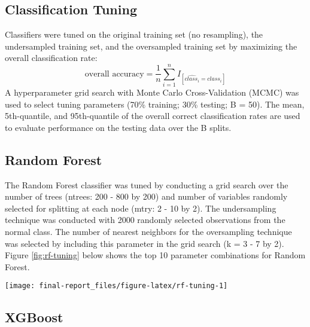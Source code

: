 \clearpage



\begin{appendix}
\clearpage
\appendix

\hypertarget{classification-tuning}{%
\section{\texorpdfstring{Classification Tuning
\label{app:tuning}}{Classification Tuning }}\label{classification-tuning}}

Classifiers were tuned on the original training set (no resampling), the
undersampled training set, and the oversampled training set by
maximizing the overall classification rate:
\[\text{overall accuracy} = \frac{1}{n}\sum_{i=1}^{n} I_{[\widehat{class_i}=class_i]}\]
A hyperparameter grid search with Monte Carlo Cross-Validation (MCMC)
was used to select tuning parameters (70\% training; 30\% testing; B =
50). The mean, 5th-quantile, and 95th-quantile of the overall correct
classification rates are used to evaluate performance on the testing
data over the B splits.

\hypertarget{random-forest}{%
\subsection{\texorpdfstring{Random Forest
\label{app:rf-tuning}}{Random Forest }}\label{random-forest}}

The Random Forest classifier was tuned by conducting a grid search over
the number of trees (ntrees: 200 - 800 by 200) and number of variables
randomly selected for splitting at each node (mtry: 2 - 10 by 2). The
undersampling technique was conducted with 2000 randomly selected
observations from the normal class. The number of nearest neighbors for
the oversampling technique was selected by including this parameter in
the grid search (k = 3 - 7 by 2). Figure \ref{fig:rf-tuning} below shows
the top 10 parameter combinations for Random Forest.

\begin{center}\texttt{[image: final-report\_files/figure-latex/rf-tuning-1]} \end{center}

\hypertarget{xgboost}{%
\subsection{\texorpdfstring{XGBoost
\label{app:xgb-tuning}}{XGBoost }}\label{xgboost}}


\end{appendix}
